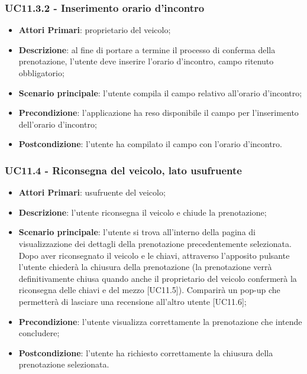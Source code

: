 \subsubsection{UC11.3.2 - Inserimento orario d'incontro}
\begin{itemize}
	\item \textbf{Attori Primari}: proprietario del veicolo;
	\item \textbf{Descrizione}: al fine di portare a termine il processo di conferma della prenotazione, l'utente deve inserire l'orario d'incontro, campo ritenuto obbligatorio;
	\item \textbf{Scenario principale}: l'utente compila il campo relativo all'orario d'incontro;	
	\item \textbf{Precondizione}: l'applicazione ha reso disponibile il campo per l'inserimento dell'orario d'incontro;
	\item \textbf{Postcondizione}: l'utente ha compilato il campo con l'orario d'incontro.	
\end{itemize}
\subsubsection{UC11.4 - Riconsegna del veicolo, lato usufruente}
\begin{itemize}
	\item \textbf{Attori Primari}: usufruente del veicolo;
	\item \textbf{Descrizione}: l'utente riconsegna il veicolo e chiude la prenotazione;
	\item \textbf{Scenario principale}: l'utente si trova all'interno della pagina di visualizzazione dei dettagli della prenotazione precedentemente selezionata. Dopo aver riconsegnato il veicolo e le chiavi, attraverso l'apposito pulsante l'utente chiederà la chiusura della prenotazione (la prenotazione verrà definitivamente chiusa quando anche il proprietario del veicolo confermerà la riconsegna delle chiavi e del mezzo [UC11.5]). Comparirà un pop-up che permetterà di lasciare una recensione all'altro utente [UC11.6];
	\item \textbf{Precondizione}: l'utente visualizza correttamente la prenotazione che intende concludere;
	\item \textbf{Postcondizione}: l'utente ha richiesto correttamente la chiusura della prenotazione selezionata.
\end{itemize}
